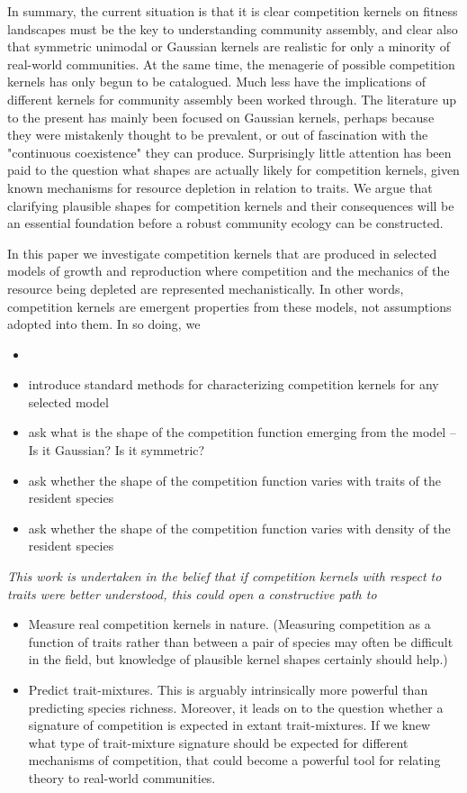 \documentclass[a4paper,11pt]{article}
\begin{document}
In summary, the current situation is that it is clear competition kernels on fitness landscapes must be the key to understanding community assembly, and clear also that symmetric unimodal or Gaussian kernels are realistic for only a minority of real-world communities. At the same time, the menagerie of possible competition kernels has only begun to be catalogued. Much less have the implications of different kernels for community assembly been worked through. The literature up to the present has mainly been focused on Gaussian kernels, perhaps because they were mistakenly thought to be prevalent, or out of fascination with the "continuous coexistence" they can produce. Surprisingly little attention has been paid to the question what shapes are actually likely for competition kernels, given known mechanisms for resource depletion in relation to traits. We argue that clarifying plausible shapes for competition kernels and their consequences will be an essential foundation before a robust community ecology can be constructed.

In this paper we investigate competition kernels that are produced in selected models of growth and reproduction where competition and the mechanics of the resource being depleted are represented mechanistically. In other words, competition kernels are emergent properties from these models, not assumptions adopted into them. In so doing, we
\begin{itemize}
\item
\item introduce standard methods for characterizing competition kernels for any selected model
\item ask what is the shape of the competition function emerging from the model -- Is it Gaussian? Is it symmetric?
\item ask whether the shape of the competition function varies with traits of the resident species
\item ask whether the shape of the competition function varies with density of the resident species
\end{itemize}

\textit{This work is undertaken in the belief that if competition kernels with respect to traits were better understood, this could open a constructive path to}
\begin{itemize}
\item Measure real competition kernels in nature. (Measuring competition as a function of traits rather than between a pair of species may often be difficult in the field, but knowledge of plausible kernel shapes certainly should help.)
\item Predict trait-mixtures. This is arguably intrinsically more powerful than predicting species richness. Moreover, it leads on to the question whether a signature of competition is expected in extant trait-mixtures. If we knew what type of trait-mixture signature should be expected for different mechanisms of competition, that could become a powerful tool for relating theory to real-world communities.
\end{itemize}
\end{document}
